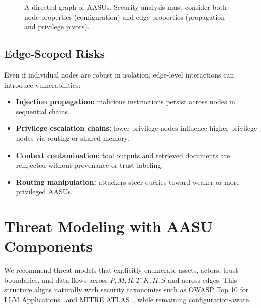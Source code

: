 \documentclass[11pt]{article}
\newcommand{\AASU}{\textsc{AASU}}
\newcommand{\AASUs}{\AASU{}s}
\begin{document}
\begin{figure}[t]
  \centering
  \caption{A directed graph of \AASUs{}. Security analysis must consider both node properties (configuration) and edge properties (propagation and privilege pivots).}
  \label{fig:graph}
\end{figure}

\subsection{Edge-Scoped Risks}
Even if individual nodes are robust in isolation, edge-level interactions can introduce vulnerabilities:
\begin{itemize}[leftmargin=*,itemsep=2pt]
  \item \textbf{Injection propagation:} malicious instructions persist across nodes in sequential chains.
  \item \textbf{Privilege escalation chains:} lower-privilege nodes influence higher-privilege nodes via routing or shared memory.
  \item \textbf{Context contamination:} tool outputs and retrieved documents are reinjected without provenance or trust labeling.
  \item \textbf{Routing manipulation:} attackers steer queries toward weaker or more privileged \AASUs{}.
\end{itemize}

\section{Threat Modeling with \AASU{} Components}
We recommend threat models that explicitly enumerate assets, actors, trust boundaries, and data flows across $P,M,R,T,K,H,S$ and across edges.
This structure aligns naturally with security taxonomies such as OWASP Top 10 for LLM Applications~\cite{owasp_llm_top10} and MITRE ATLAS~\cite{mitre_atlas},
while remaining configuration-aware.
\end{document}
